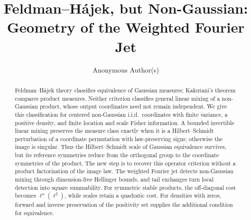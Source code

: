 \documentclass[11pt]{article}
\title{Feldman--H\'ajek, but Non-Gaussian: \\
Geometry of the Weighted Fourier Jet}
\author{Anonymous Author(s)}
\date{}
\begin{document}
\maketitle

\begin{abstract}
Feldman--H\'ajek theory classifies equivalence of Gaussian measures;
Kakutani's theorem compares product measures. Neither criterion classifies
general linear mixing of a non-Gaussian product, whose output coordinates
need not remain independent. We give this classification for centered
non-Gaussian i.i.d.\ coordinates with finite variance, a positive density,
and finite location and scale Fisher information. A bounded invertible
linear mixing preserves the measure class exactly when it is a
Hilbert--Schmidt perturbation of a coordinate permutation with
law-preserving signs; otherwise the image is singular. Thus the
Hilbert--Schmidt scale of Gaussian equivalence survives, but its reference
symmetries reduce from the orthogonal group to the coordinate symmetries
of the product. The new step is to recover this operator criterion without
a product factorization of the image law. The weighted Fourier jet detects
non-Gaussian mixing through dimension-free Hellinger bounds, and tail
exchanges turn local detection into square summability. For symmetric
stable products, the off-diagonal cost becomes \(\ell^\alpha(\ell^2)\),
while scales retain a quadratic cost. For densities with zeros, forward
and inverse preservation of the positivity set supplies the additional
condition for equivalence.
\end{abstract}









\end{document}
